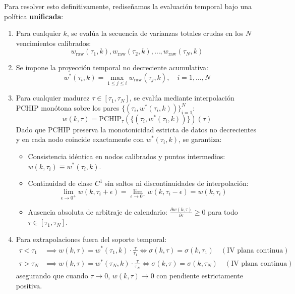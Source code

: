 \documentclass[11pt,a4paper]{article}
\begin{document}
Para resolver esto definitivamente, rediseñamos la evaluación temporal bajo una política \textbf{unificada}:
\begin{enumerate}
    \item Para cualquier $k$, se evalúa la secuencia de varianzas totales crudas en los $N$ vencimientos calibrados:
    \begin{equation}
        w_{\text{raw}}(\tau_1, k), w_{\text{raw}}(\tau_2, k), \dots, w_{\text{raw}}(\tau_N, k)
    \end{equation}
    \item Se impone la proyección temporal no decreciente acumulativa:
    \begin{equation}
        w^*(\tau_i, k) = \max_{1 \le j \le i} w_{\text{raw}}(\tau_j, k), \quad i = 1, \dots, N
    \end{equation}
    \item Para cualquier madurez $\tau \in [\tau_1, \tau_N]$, se evalúa mediante interpolación PCHIP monótona sobre los pares $\{(\tau_i, w^*(\tau_i, k))\}_{i=1}^N$:
    \begin{equation}
        w(k, \tau) = \text{PCHIP}_{\tau}\left(\{(\tau_i, w^*(\tau_i, k))\}\right)(\tau)
    \end{equation}
    Dado que PCHIP preserva la monotonicidad estricta de datos no decrecientes y en cada nodo coincide exactamente con $w^*(\tau_i, k)$, se garantiza:
    \begin{itemize}
        \item Consistencia idéntica en nodos calibrados y puntos intermedios: $w(k, \tau_i) \equiv w^*(\tau_i, k)$.
        \item Continuidad de clase $C^1$ sin saltos ni discontinuidades de interpolación:
        \begin{equation}
            \lim_{\epsilon \to 0^+} w(k, \tau_i + \epsilon) = \lim_{\epsilon \to 0^-} w(k, \tau_i - \epsilon) = w(k, \tau_i)
        \end{equation}
        \item Ausencia absoluta de arbitraje de calendario: $\frac{\partial w(k, \tau)}{\partial \tau} \ge 0$ para todo $\tau \in [\tau_1, \tau_N]$.
    \end{itemize}
    \item Para extrapolaciones fuera del soporte temporal:
    \begin{align}
        \tau < \tau_1 &\implies w(k, \tau) = w^*(\tau_1, k) \cdot \frac{\tau}{\tau_1} \iff \sigma(k, \tau) = \sigma(k, \tau_1) \quad (\text{IV plana continua}) \\
        \tau > \tau_N &\implies w(k, \tau) = w^*(\tau_N, k) \cdot \frac{\tau}{\tau_N} \iff \sigma(k, \tau) = \sigma(k, \tau_N) \quad (\text{IV plana continua})
    \end{align}
    asegurando que cuando $\tau \to 0$, $w(k, \tau) \to 0$ con pendiente estrictamente positiva.
\end{enumerate}
\end{document}
